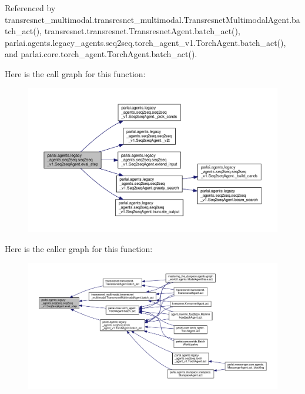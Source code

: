 Referenced by transresnet\+\_\+multimodal.\+transresnet\+\_\+multimodal.\+Transresnet\+Multimodal\+Agent.\+batch\+\_\+act(), transresnet.\+transresnet.\+Transresnet\+Agent.\+batch\+\_\+act(), parlai.\+agents.\+legacy\+\_\+agents.\+seq2seq.\+torch\+\_\+agent\+\_\+v1.\+Torch\+Agent.\+batch\+\_\+act(), and parlai.\+core.\+torch\+\_\+agent.\+Torch\+Agent.\+batch\+\_\+act().

Here is the call graph for this function\+:
\nopagebreak
\begin{figure}[H]
\begin{center}
\leavevmode
\includegraphics[width=350pt]{classparlai_1_1agents_1_1legacy__agents_1_1seq2seq_1_1seq2seq__v1_1_1Seq2seqAgent_ad06de7c94ee40c403f792e7b48e0b137_cgraph}
\end{center}
\end{figure}
Here is the caller graph for this function\+:
\nopagebreak
\begin{figure}[H]
\begin{center}
\leavevmode
\includegraphics[width=350pt]{classparlai_1_1agents_1_1legacy__agents_1_1seq2seq_1_1seq2seq__v1_1_1Seq2seqAgent_ad06de7c94ee40c403f792e7b48e0b137_icgraph}
\end{center}
\end{figure}
\mbox{\label{classparlai_1_1agents_1_1legacy__agents_1_1seq2seq_1_1seq2seq__v1_1_1Seq2seqAgent_aa1e972eb8a41c98486a50baa14700345}} 
